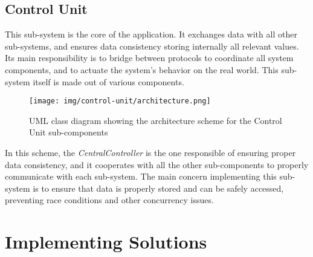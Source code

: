 \documentclass[a4paper,12pt]{report}
\begin{document}
	\section{Control Unit}
	This sub-system is the core of the application. It exchanges data with all other sub-systems, and ensures data consistency storing internally all relevant values. Its main responsibility is to bridge between protocols to coordinate all system components, and to actuate the system's behavior on the real world.
	\newline This sub-system itself is made out of various components.
	\begin{figure}[H]
		\centering{}
		\texttt{[image: img/control-unit/architecture.png]}
		\caption{UML class diagram showing the architecture scheme for the Control Unit sub-components}
		\label{img:control-unit/architecture}
	\end{figure}
	In this scheme, the \textit{CentralController} is the one responsible of ensuring proper data consistency, and it cooperates with all the other sub-components to properly communicate with each sub-system.
	\newline The main concern implementing this sub-system is to ensure that data is properly stored and can be safely accessed, preventing race conditions and other concurrency issues.
	
	\chapter{Implementing Solutions}
\end{document}
